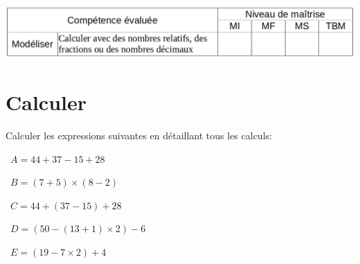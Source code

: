 	\includegraphics[scale=0.4]{competences}
	
	\section{Calculer}
	Calculer les expressions suivantes en détaillant tous les calculs:
	\begin{questions}
		
		\question[2]  $A =  44 + 37 - 15 + 28$
		
		\fillwithdottedlines{6cm}
		
		
		
		\question[2]  $B = (7 + 5) \times (8 - 2)$
		
		\fillwithdottedlines{6cm}
		
		\newpage
		\question[2]  $C =  44 + (37 - 15) + 28$
		
		\fillwithdottedlines{6cm}
		
		
		\question[2]  $D = (50 - (13 + 1) \times 2) - 6$
		
		\fillwithdottedlines{6cm}
		
		
		\question[2]  $E = (19 - 7 \times 2) + 4$
		
		\fillwithdottedlines{6cm}
	\end{questions}
	
	
